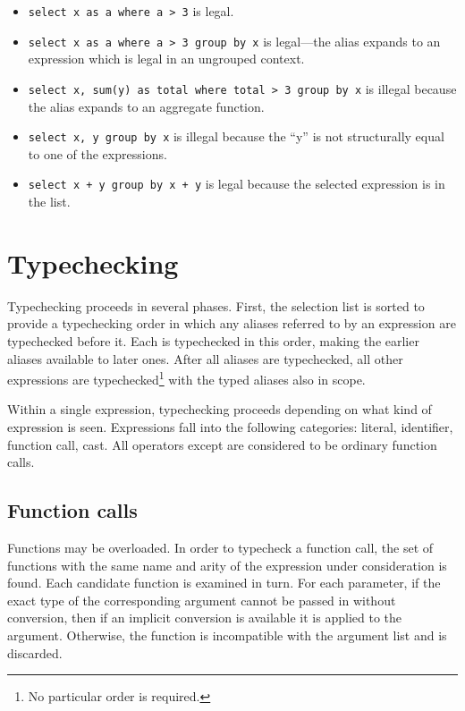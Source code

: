 \documentclass{article}
\begin{document}
\begin{itemize}
\item \lstinline|select x as a where a > 3| is legal.
\item \lstinline|select x as a where a > 3 group by x| is legal---the
  alias expands to an expression which is legal in an ungrouped context.
\item \lstinline|select x, sum(y) as total where total > 3 group by x| is
  illegal because the alias expands to an aggregate function.
\item \lstinline|select x, y group by x| is illegal because the ``y''
  is not structurally equal to one of the  expressions.
\item \lstinline|select x + y group by x + y| is legal because the selected
  expression is in the  list.
\end{itemize}

\section{Typechecking}

Typechecking proceeds in several phases.  First, the selection list is
sorted to provide a typechecking order in which any aliases referred
to by an expression are typechecked before it.  Each is typechecked in
this order, making the earlier aliases available to later ones.  After
all aliases are typechecked, all other expressions are
typechecked\footnote{No particular order is required.} with the typed
aliases also in scope.

Within a single expression, typechecking proceeds depending on what
kind of expression is seen.  Expressions fall into the following
categories: literal, identifier, function call, cast.  All operators
except \code{::} are considered to be ordinary function calls.

\subsection{Function calls}

Functions may be overloaded.  In order to typecheck a function call,
the set of functions with the same name and arity of the expression
under consideration is found.  Each candidate function is examined in
turn.  For each parameter, if the exact type of the corresponding
argument cannot be passed in without conversion, then if an implicit
conversion is available it is applied to the argument.  Otherwise, the
function is incompatible with the argument list and is discarded.
\end{document}
